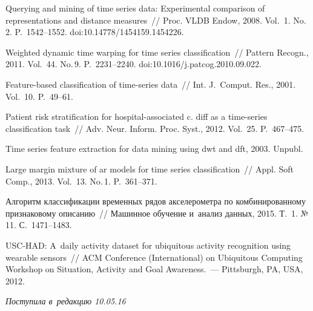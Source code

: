 \begin{multicols}{2}
{{\begin{thebibliography}{99}
Querying and mining of time series data: Experimental comparison of representations and distance measures~//
{Proc. VLDB Endow}, 2008. Vol.~1. No.\,2. P.~1542--1552.
 doi:10.14778/1454159.1454226.

Weighted dynamic time warping for time series classification~//
{Pattern Recogn.}, 2011. Vol.~44. No.\,9. P.~2231--2240.
doi:10.1016/j.patcog.2010.09.022.

Feature-based classification of time-series data~//
{Int. J.~Comput. Res.}, 2001. Vol.~10. P.~49--61.

Patient risk stratification for hospital-associated c. diff as a time-series classification task~//
{Adv. Neur. Inform. Proc. Syst.}, 2012. Vol.~25. P.~467--475.

 Time series feature extraction for data mining using dwt and dft,
 2003. Unpubl.

 Large margin mixture of ar models for time series classification~//
{Appl. Soft Comp.}, 2013. Vol.~13. No.\,1. P.~361--371.

 Алгоритм классификации временных рядов акселерометра по комбинированному признаковому описанию~//
 {Машинное обучение и~анализ данных}, 2015. Т.~1. №\,11. С.~1471--1483.

 USC-HAD: A~daily activity dataset for ubiquitous activity recognition 
 using wearable sensors~//
 {ACM Conference (International) on Ubiquitous Computing Workshop on Situation, 
 Activity and Goal Awareness}.~--- Pittsburgh, PA, USA, 2012.
 \end{thebibliography}

 }
 }

\end{multicols}


\hfill{\small\textit{Поступила в~редакцию 10.05.16}}

\vspace*{14pt}

